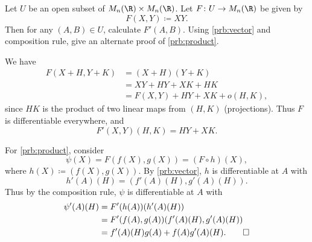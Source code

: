 \documentclass[12pt]{article}
\begin{document}
\begin{problem}
    Let $U$ be an open subset of $M_n(\R) \times M_n(\R)$.
    Let $F\colon U \to M_n(\R)$ be given by \[
        F(X, Y) \coloneq XY.
    \] Then for any $(A, B) \in U$, calculate $F'(A, B)$.
    Using \cref{prb:vector} and composition rule, give an alternate proof
    of \cref{prb:product}.
\end{problem}
\begin{solution}
    We have \begin{align*}
        F(X + H, Y + K) &= (X + H)(Y + K) \\
        &= XY + HY + XK + HK \\
        &= F(X, Y) + HY + XK + o(H, K),
    \end{align*} since $HK$ is the product of two linear maps
    from $(H, K)$ (projections).
    Thus $F$ is differentiable everywhere, and \[
        F'(X, Y)(H, K) = HY + XK.
    \]

    For \cref{prb:product}, consider \[
        \psi(X) = F(f(X), g(X)) = (F \circ h)(X),
    \] where $h(X) \coloneq (f(X), g(X))$.
    By \cref{prb:vector}, $h$ is differentiable at $A$ with \[
        h'(A)(H) = (f'(A)(H), g'(A)(H)).
    \] Thus by the composition rule, $\psi$ is differentiable at $A$ with
    \begin{align*}
        \psi'(A)(H) &= F'(h(A))(h'(A)(H)) \\
        &= F'(f(A), g(A))(f'(A)(H), g'(A)(H)) \\
        &= f'(A)(H)g(A) + f(A)g'(A)(H). \qedhere
    \end{align*}
\end{solution}
\end{document}
